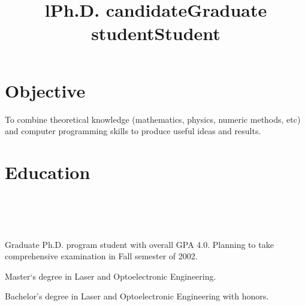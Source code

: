 \documentclass[10pt,overlapped,line]{res}
\begin{document}
\address{ 
  \textbf{Mailing Address: }\newline 
  Computer Science Dept.\\
  FEC UNM\\
  Albuquerque NM, 87131 USA \newline
}  
\address{
   \textbf{Current Address }: Ortiz SE.  Apt.13\\
   Albuquerque NM, 87108 \\
   USA
}
\address{  
  \href{URL}{email: yoh@cs.unm.edu}\\ 
  \href{URL}{http://www.onerussian.com}\\
  \texttt{[505]266-5958 (home)}
} 
 
\begin{resume}

\section{Objective} 
To combine theoretical knowledge (mathematics, physics, numeric
methods, etc) and computer programming skills to produce useful ideas
and results.
   
\section{Education}
\begin{format}
  \title{l}\\
  \\
  \body\\
\end{format}

\title{Ph.D. candidate}
\begin{position}
  Graduate Ph.D. program student with overall GPA 4.0. Planning to
take comprehensive examination in Fall semester of 2002.
\end{position}

\title{Graduate student}
\begin{position}
 Master`s degree in Laser and Optoelectronic Engineering.
\end{position}

\title{Student}
\begin{position}
 Bachelor's degree in Laser and Optoelectronic Engineering with
 honors.
\end{position}


\end{resume}
\end{document}
